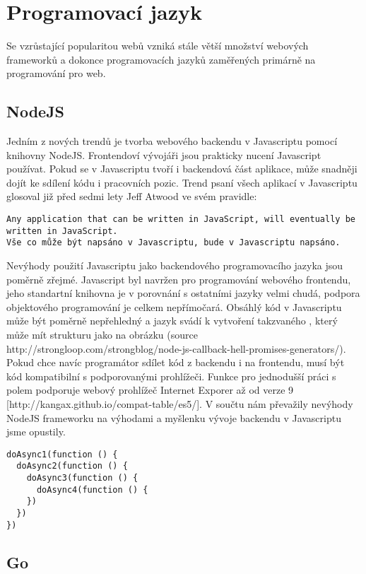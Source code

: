 \section{Programovací jazyk}

Se vzrůstající popularitou webů vzniká stále větší množství webových frameworků a dokonce programovacích jazyků zaměřených primárně na programování pro web.

\subsection{NodeJS}
Jedním z nových trendů je tvorba webového backendu v Javascriptu pomocí knihovny NodeJS. Frontendoví vývojáři jsou prakticky nucení Javascript používat. Pokud se v Javascriptu tvoří i backendová část aplikace, může snadněji dojít ke sdílení kódu i pracovních pozic. Trend psaní všech aplikací v Javascriptu glosoval již před sedmi lety Jeff Atwood ve svém pravidle:

\begin{lstlisting}
Any application that can be written in JavaScript, will eventually be written in JavaScript.
Vše co může být napsáno v Javascriptu, bude v Javascriptu napsáno.
\end{lstlisting}

Nevýhody použití Javascriptu jako backendového programovacího jazyka jsou poměrně zřejmé. Javascript byl navržen pro programování webového frontendu, jeho standartní knihovna je v porovnání s ostatními jazyky velmi chudá, podpora objektového programování je celkem nepřímočará. Obsáhlý kód v Javascriptu může být poměrně nepřehledný a jazyk svádí k vytvoření takzvaného , který může mít strukturu jako na obrázku (source http://strongloop.com/strongblog/node-js-callback-hell-promises-generators/). Pokud chce navíc programátor sdílet kód z backendu i na frontendu, musí být kód kompatibilní s podporovanými prohlížeči. Funkce pro jednodušší práci s polem podporuje webový prohlížeč Internet Exporer až od verze 9 [http://kangax.github.io/compat-table/es5/]. V součtu nám převažily nevýhody NodeJS frameworku na výhodami a myšlenku vývoje backendu v Javascriptu jsme opustily.

\begin{lstlisting}
doAsync1(function () {
  doAsync2(function () {
    doAsync3(function () {
      doAsync4(function () {
    })
  })
})
\end{lstlisting}

\subsection{Go}


